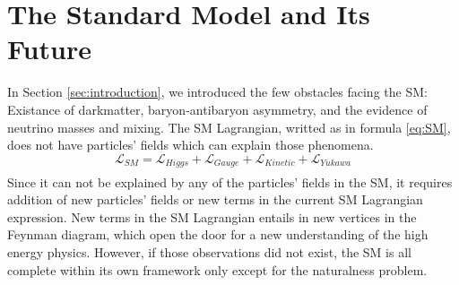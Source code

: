 \chapter{The Standard Model and Its Future}\label{sec:theory}

In Section \ref{sec:introduction}, we introduced the few obstacles facing the SM: Existance of darkmatter, baryon-antibaryon asymmetry, and the evidence of neutrino masses and mixing. 
The SM Lagrangian, writted as in formula \ref{eq:SM}, does not have particles' fields which can explain those phenomena.
\begin{equation}
\label{eq:SM}
\mathcal{L}_{SM} = \mathcal{L}_{Higgs}+\mathcal{L}_{Gauge}+\mathcal{L}_{Kinetic}+\mathcal{L}_{Yukawa}
\end{equation}
\begin{align*}
\end{align*}
Since it can not be explained by any of the particles' fields in the SM, it requires addition of new particles' fields or new terms in the current SM Lagrangian expression.
New terms in the SM Lagrangian entails in new vertices in the Feynman diagram, which open the door for a new understanding of the high energy physics.
However, if those observations did not exist, the SM is all complete within its own framework only except for the naturalness problem.

